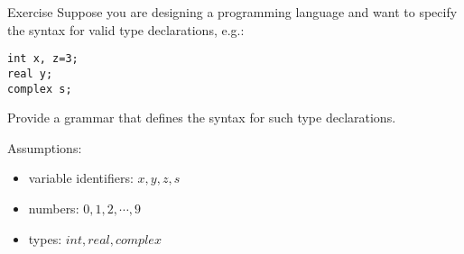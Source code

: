 \documentclass{prosper}%
\begin{document}
\begin{slide}{Exercise}
Suppose you are designing a programming language and want to specify the syntax for valid type declarations, e.g.:
\begin{verbatim}
int x, z=3;
real y;
complex s;
\end{verbatim}

Provide a grammar that defines the syntax for such type declarations.

Assumptions:
\begin{itemize}
\item variable identifiers: $x, y, z, s$
\item numbers: $0, 1, 2, \cdots, 9$
\item types: $int, real, complex$
\end{itemize}
\end{slide}
\end{document}
